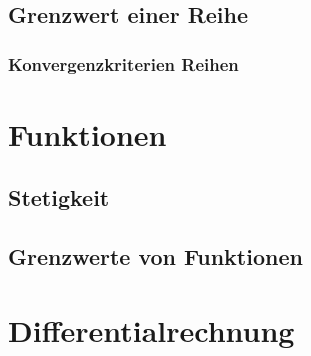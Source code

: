 \documentclass[a4paper, fontsize = 7pt, landscape]{scrartcl}
\begin{document}
\begin{multicols*}{3}
                \raggedcolumns
                \columnbreak
                
                
            \subsection{Grenzwert einer Reihe}
		      
                
            
                
                
                
                
                \subsubsection{Konvergenzkriterien Reihen}
                
                
                
               
                   
                \raggedcolumns
                \columnbreak

                \section{Funktionen}
                    
                    \subsection{Stetigkeit}
                    

                \subsection{Grenzwerte von Funktionen}
                    
                    
                    \raggedcolumns
                    \columnbreak

                \section{Differentialrechnung}

\end{multicols*}
\end{document}

